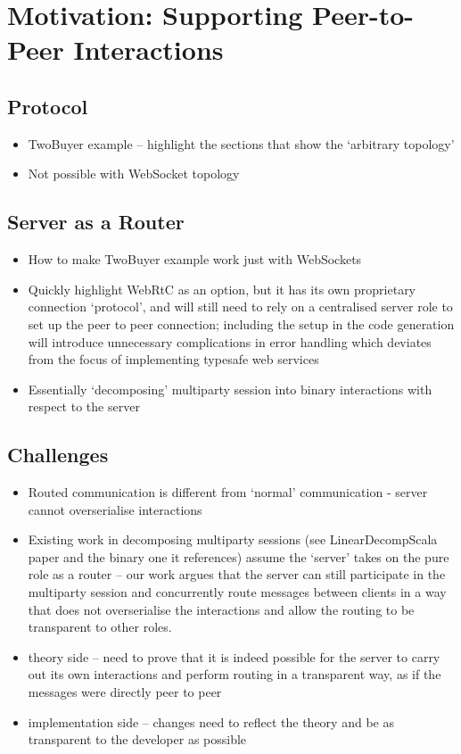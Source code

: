 \chapter{Motivation: Supporting Peer-to-Peer Interactions}
\label{chap:p2p}

\section{ Protocol}
\begin{itemize}
\item TwoBuyer example -- highlight the sections that show the `arbitrary topology'
\item Not possible with WebSocket topology
\end{itemize}

\section{Server as a Router}
\begin{itemize}
\item How to make TwoBuyer example work just with WebSockets
\item Quickly highlight WebRtC as an option, but it has its own proprietary connection `protocol', and will still need to rely on a centralised server role to set up the peer to peer connection; including the setup in the code generation will introduce unnecessary complications in error handling which deviates from the focus of implementing typesafe web services
\item Essentially `decomposing' multiparty session into binary interactions with respect to the server
\end{itemize}

\section{Challenges}
\begin{itemize}
\item Routed communication is different from `normal' communication
- server cannot overserialise interactions
\item Existing work in decomposing multiparty sessions (see LinearDecompScala paper and the binary one it references) assume the `server' takes on the pure role as a router -- our work argues that the server can still participate in the multiparty session and concurrently route messages between clients in a way that does not overserialise the interactions and allow the routing to be transparent to other roles.
\item theory side -- need to prove that it is indeed possible for the server to carry out its own interactions and perform routing in a transparent way, as if the messages were directly peer to peer
\item implementation side -- changes need to reflect the theory and be as transparent to the developer as possible
\end{itemize}